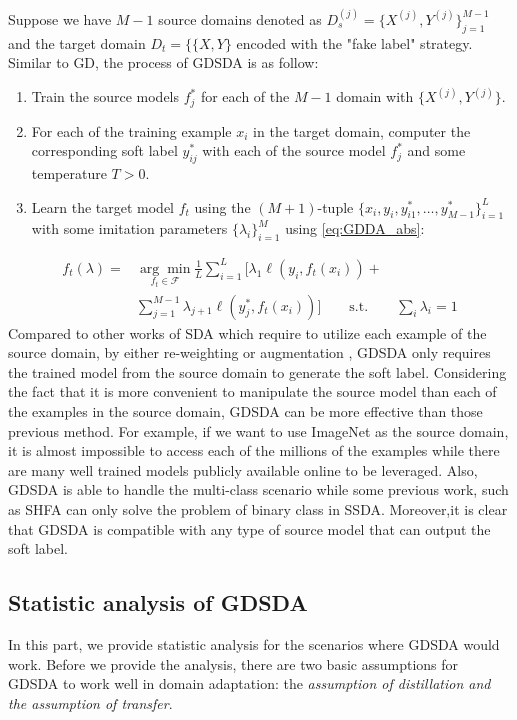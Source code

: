 Suppose we have $M-1$ source domains denoted as $D_s^{(j)}=\{X^{(j)},Y^{(j)}\}_{j=1}^{M-1}$ and the target domain $D_t=\{\{X,Y\}$ encoded with the "fake label" strategy. Similar to GD, the process of GDSDA is as follow:
\begin{enumerate}
    \item Train the source models $f^*_j$ for each of the $M-1$ domain with $\{X^{(j)},Y^{(j)}\}$.
    \item For each of the training example $x_i$ in the target domain, computer the corresponding soft label $y^*_{ij}$ with each of the source model $f^*_j$ and some temperature $T>0$.
    \item Learn the target model $f_t$ using the $(M+1)$-tuple $\{x_i,y_i,y^*_{i1},\dots,y^*_{M-1}\}_{i=1}^L$ with some imitation parameters $\{\lambda_i\}^M_{i=1}$ using \eqref{eq:GDDA_abs}:
\end{enumerate} 
\begin{equation}\label{eq:GDDA_abs}
\begin{aligned}
f_t(\lambda)=&\underset{f_t \in \mathcal{F}}{\arg \min}\frac{1}{L}\sum_{i=1}^{L}\bigg[\lambda_1\ell\left(y_i,f_t(x_i)\right)+\\&\sum_{j=1}^{M-1}\lambda_{j+1}\ell\left(y^*_j,f_t(x_i)\right)\bigg]\qquad
 \text{s.t.} \qquad \sum_i\lambda_i=1
\end{aligned}
\end{equation}
Compared to other works of SDA which require to utilize each example of the source domain, by either re-weighting \cite{Donahue_2013_CVPR,duan2012visual} or augmentation \cite{daume2010frustratingly}, GDSDA only requires the trained model from the source domain to generate the soft label. Considering the fact that it is more convenient to manipulate the source model than each of the examples in the source domain, GDSDA can be more effective than those previous method. For example, if we want to use ImageNet \cite{imagenet_cvpr09} as the source domain, it is almost impossible to access each of the millions of the examples while there are many well trained models publicly available online to be leveraged. Also, GDSDA is able to handle the multi-class scenario while some previous work, such as SHFA\cite{duan2012learning} can only solve the problem of binary class in SSDA. Moreover,it is clear that GDSDA is compatible with any type of source model that can output the soft label.

\subsection{Statistic analysis of GDSDA}
In this part, we provide statistic analysis for the scenarios where GDSDA would work. Before we provide the analysis, there are two basic assumptions for GDSDA to work well in domain adaptation: the \textit{assumption of distillation and the assumption of  transfer}.

